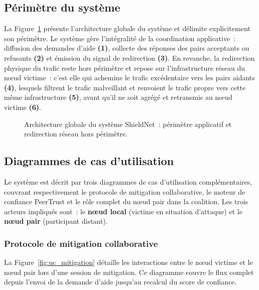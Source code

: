 \subsection{Périmètre du système}
\label{subsec:perimetre_redirection}

La Figure~\ref{fig:archi_redirection} présente l'architecture globale du système 
et délimite explicitement son périmètre. Le système gère l'intégralité de la 
coordination applicative~: diffusion des demandes d'aide \textbf{(1)}, collecte 
des réponses des pairs acceptants ou refusants \textbf{(2)} et émission du signal 
de redirection \textbf{(3)}. En revanche, la redirection physique du trafic reste 
hors périmètre et repose sur l'infrastructure réseau du nœud victime~: c'est elle qui achemine le trafic excédentaire vers les 
pairs aidants \textbf{(4)}, lesquels filtrent le trafic malveillant et renvoient 
le trafic propre vers cette même infrastructure \textbf{(5)}, avant qu'il ne soit 
agrégé et retransmis au nœud victime \textbf{(6)}.

\begin{figure}[H]
\centering
{}
\caption{Architecture globale du système ShieldNet~: périmètre applicatif et redirection réseau hors périmètre.}
\label{fig:archi_redirection}
\end{figure}

\subsection{Diagrammes de cas d'utilisation}
\label{subsec:uc}

Le système est décrit par trois diagrammes de cas d'utilisation complémentaires, couvrant respectivement le protocole de mitigation collaborative, le moteur de confiance PeerTrust et le rôle complet du nœud pair dans la coalition. Les trois acteurs impliqués sont~: le \textbf{nœud local} (victime en situation d'attaque) et le \textbf{nœud pair} (participant distant).

\subsubsection{Protocole de mitigation collaborative}
La Figure~\ref{fig:uc_mitigation} détaille les interactions entre le nœud victime 
et le nœud pair lors d'une session de mitigation. Ce diagramme couvre le flux complet 
depuis l'envoi de la demande d'aide jusqu'au recalcul du score de confiance.

